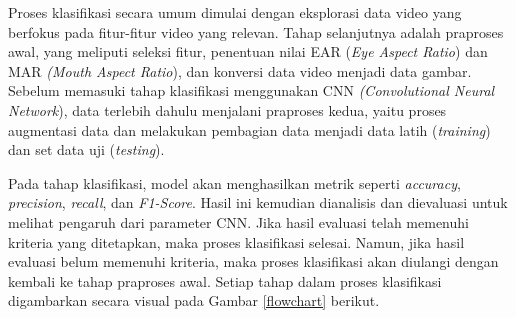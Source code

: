     Proses klasifikasi secara umum dimulai dengan eksplorasi data video yang berfokus pada fitur-fitur video yang relevan.
     Tahap selanjutnya adalah praproses awal, yang meliputi seleksi fitur, penentuan nilai EAR (\textit{Eye Aspect Ratio})
      dan MAR \textit{(Mouth Aspect Ratio}), dan konversi data video menjadi data gambar. Sebelum memasuki tahap
       klasifikasi menggunakan CNN \textit{(Convolutional Neural Network}), data terlebih dahulu menjalani praproses
        kedua, yaitu proses augmentasi data dan melakukan pembagian data menjadi data latih (\textit{training}) 
        dan set data uji (\textit{testing}).

    Pada tahap klasifikasi, model akan menghasilkan metrik seperti \textit{accuracy}, \textit{precision}, \textit{recall},
     dan \textit{F1-Score}. Hasil ini kemudian dianalisis dan dievaluasi untuk melihat pengaruh dari parameter CNN. 
     Jika hasil evaluasi telah memenuhi kriteria yang ditetapkan, maka proses klasifikasi selesai. Namun, 
     jika hasil evaluasi belum memenuhi kriteria, maka proses klasifikasi akan diulangi dengan kembali ke tahap 
     praproses awal. Setiap tahap dalam proses klasifikasi digambarkan secara visual pada Gambar \ref{flowchart} berikut.


